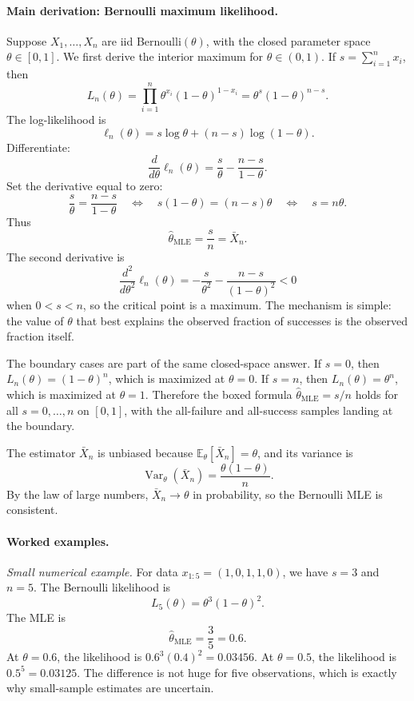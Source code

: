 \paragraph{Main derivation: Bernoulli maximum likelihood.}
Suppose \(X_1,\ldots,X_n\) are iid Bernoulli\((\theta)\), with the closed parameter space \(\theta\in[0,1]\). We first derive the interior maximum for \(\theta\in(0,1)\). If \(s=\sum_{i=1}^n x_i\), then
\[
L_n(\theta)
=\prod_{i=1}^n \theta^{x_i}(1-\theta)^{1-x_i}
=\theta^s(1-\theta)^{n-s}.
\]
The log-likelihood is
\[
\ell_n(\theta)=s\log\theta+(n-s)\log(1-\theta).
\]
Differentiate:
\[
\frac{d}{d\theta}\ell_n(\theta)
=\frac{s}{\theta}-\frac{n-s}{1-\theta}.
\]
Set the derivative equal to zero:
\[
\frac{s}{\theta}=\frac{n-s}{1-\theta}
\quad\Longleftrightarrow\quad
s(1-\theta)=(n-s)\theta
\quad\Longleftrightarrow\quad
s=n\theta.
\]
Thus
\[
\boxed{\hat\theta_{\mathrm{MLE}}=\frac{s}{n}=\bar X_n.}
\]
The second derivative is
\[
\frac{d^2}{d\theta^2}\ell_n(\theta)
=-\frac{s}{\theta^2}-\frac{n-s}{(1-\theta)^2}<0
\]
when \(0<s<n\), so the critical point is a maximum. The mechanism is simple: the value of \(\theta\) that best explains the observed fraction of successes is the observed fraction itself.

The boundary cases are part of the same closed-space answer. If \(s=0\), then \(L_n(\theta)=(1-\theta)^n\), which is maximized at \(\theta=0\). If \(s=n\), then \(L_n(\theta)=\theta^n\), which is maximized at \(\theta=1\). Therefore the boxed formula \(\hat\theta_{\mathrm{MLE}}=s/n\) holds for all \(s=0,\ldots,n\) on \([0,1]\), with the all-failure and all-success samples landing at the boundary.

The estimator \(\bar X_n\) is unbiased because \(\mathbb E_\theta[\bar X_n]=\theta\), and its variance is
\[
\operatorname{Var}_\theta(\bar X_n)=\frac{\theta(1-\theta)}{n}.
\]
By the law of large numbers, \(\bar X_n\to\theta\) in probability, so the Bernoulli MLE is consistent.

\paragraph{Worked examples.}
\emph{Small numerical example.}
For data \(x_{1:5}=(1,0,1,1,0)\), we have \(s=3\) and \(n=5\). The Bernoulli likelihood is
\[
L_5(\theta)=\theta^3(1-\theta)^2.
\]
The MLE is
\[
\hat\theta_{\mathrm{MLE}}=\frac{3}{5}=0.6.
\]
At \(\theta=0.6\), the likelihood is \(0.6^3(0.4)^2=0.03456\). At \(\theta=0.5\), the likelihood is \(0.5^5=0.03125\). The difference is not huge for five observations, which is exactly why small-sample estimates are uncertain.

